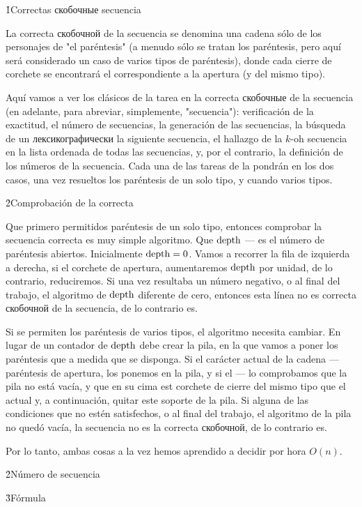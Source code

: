 \h1{Correctas скобочные secuencia}

La correcta скобочной de la secuencia se denomina una cadena sólo de los personajes de "el paréntesis" (a menudo sólo se tratan los paréntesis, pero aquí será considerado un caso de varios tipos de paréntesis), donde cada cierre de corchete se encontrará el correspondiente a la apertura (y del mismo tipo).

Aquí vamos a ver los clásicos de la tarea en la correcta скобочные de la secuencia (en adelante, para abreviar, simplemente, "secuencia"): verificación de la exactitud, el número de secuencias, la generación de las secuencias, la búsqueda de un лексикографически la siguiente secuencia, el hallazgo de la $k$-oh secuencia en la lista ordenada de todas las secuencias, y, por el contrario, la definición de los números de la secuencia. Cada una de las tareas de la pondrán en los dos casos, una vez resueltos los paréntesis de un solo tipo, y cuando varios tipos.


\h2{Comprobación de la correcta}

Que primero permitidos paréntesis de un solo tipo, entonces comprobar la secuencia correcta es muy simple algoritmo. Que $\rm depth$ --- es el número de paréntesis abiertos. Inicialmente $\rm depth = 0$. Vamos a recorrer la fila de izquierda a derecha, si el corchete de apertura, aumentaremos $\rm depth$ por unidad, de lo contrario, reduciremos. Si una vez resultaba un número negativo, o al final del trabajo, el algoritmo de $\rm depth$ diferente de cero, entonces esta línea no es correcta скобочной de la secuencia, de lo contrario es.

Si se permiten los paréntesis de varios tipos, el algoritmo necesita cambiar. En lugar de un contador de $\rm depth$ debe crear la pila, en la que vamos a poner los paréntesis que a medida que se disponga. Si el carácter actual de la cadena --- paréntesis de apertura, los ponemos en la pila, y si el --- lo comprobamos que la pila no está vacía, y que en su cima est corchete de cierre del mismo tipo que el actual y, a continuación, quitar este soporte de la pila. Si alguna de las condiciones que no estén satisfechos, o al final del trabajo, el algoritmo de la pila no quedó vacía, la secuencia no es la correcta скобочной, de lo contrario es.

Por lo tanto, ambas cosas a la vez hemos aprendido a decidir por hora $O(n)$.


\h2{Número de secuencia}

\h3{Fórmula}

